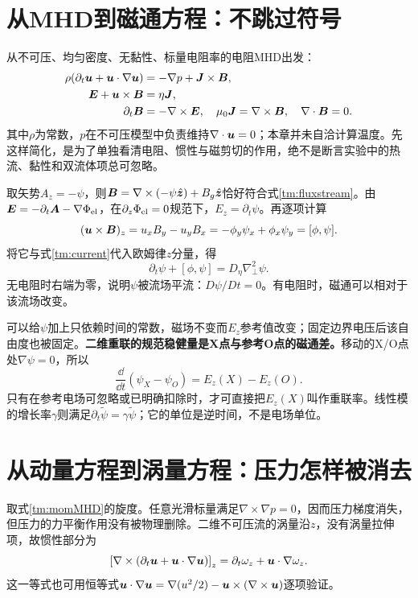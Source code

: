 \section{从MHD到磁通方程：不跳过符号}
从不可压、均匀密度、无黏性、标量电阻率的电阻MHD出发：
\begin{align}
 \rho(\partial_t\bm{u}+\bm{u}\cdot\nabla\bm{u})&=-\nabla p+\bm{J}\times\bm{B},\label{tm:momMHD}\\
 \bm{E}+\bm{u}\times\bm{B}&=\eta\bm{J},\label{tm:ohmMHD}\\
 \partial_t\bm{B}&=-\nabla\times\bm{E},\quad
 \mu_0\bm{J}=\nabla\times\bm{B},\quad\nabla\cdot\bm{B}=0.
\end{align}
其中$\rho$为常数，$p$在不可压模型中负责维持$\nabla\cdot\bm{u}=0$；本章并未自洽计算温度。先这样简化，是为了单独看清电阻、惯性与磁剪切的作用，绝不是断言实验中的热流、黏性和双流体项总可忽略。

取矢势$A_z=-\psi$，则$\bm{B}=\nabla\times(-\psi\hat{\bm{z}})+B_g\hat{\bm{z}}$恰好符合式\eqref{tm:fluxstream}。由$\bm{E}=-\partial_t\bm{A}-\nabla\Phi_{\rm el}$，在$\partial_z\Phi_{\rm el}=0$规范下，$E_z=\partial_t\psi$。再逐项计算
\begin{equation}
 (\bm{u}\times\bm{B})_z=u_xB_y-u_yB_x
 =-\phi_y\psi_x+\phi_x\psi_y=[\phi,\psi].
\end{equation}
将它与式\eqref{tm:current}代入欧姆律$z$分量，得
\begin{equation}
 \boxed{\partial_t\psi+[\phi,\psi]=D_\eta\nabla_\perp^2\psi.}
 \label{tm:induction}
\end{equation}
无电阻时右端为零，说明$\psi$被流场平流：$D\psi/Dt=0$。有电阻时，磁通可以相对于该流场改变。

可以给$\psi$加上只依赖时间的常数，磁场不变而$E_z$参考值改变；固定边界电压后该自由度也被固定。\textbf{二维重联的规范稳健量是X点与参考O点的磁通差。}移动的X/O点处$\nabla\psi=0$，所以
\begin{equation}
 \frac{\dd}{\dd t}(\psi_X-\psi_O)=E_z(X)-E_z(O).
 \label{tm:fluxrate}
\end{equation}
只有在参考电场可忽略或已明确扣除时，才可直接把$E_z(X)$叫作重联率。线性模的增长率$\gamma$则满足$\partial_t\widetilde\psi=\gamma\widetilde\psi$；它的单位是逆时间，不是电场单位。

\section{从动量方程到涡量方程：压力怎样被消去}
取式\eqref{tm:momMHD}的旋度。任意光滑标量满足$\nabla\times\nabla p=0$，因而压力梯度消失，但压力的力平衡作用没有被物理删除。二维不可压流的涡量沿$z$，没有涡量拉伸项，故惯性部分为
\begin{equation}
 \left[\nabla\times(\partial_t\bm{u}+\bm{u}\cdot\nabla\bm{u})\right]_z
 =\partial_t\omega_z+\bm{u}\cdot\nabla\omega_z.
\end{equation}
这一等式也可用恒等式$\bm{u}\cdot\nabla\bm{u}=\nabla(u^2/2)-\bm{u}\times(\nabla\times\bm{u})$逐项验证。

